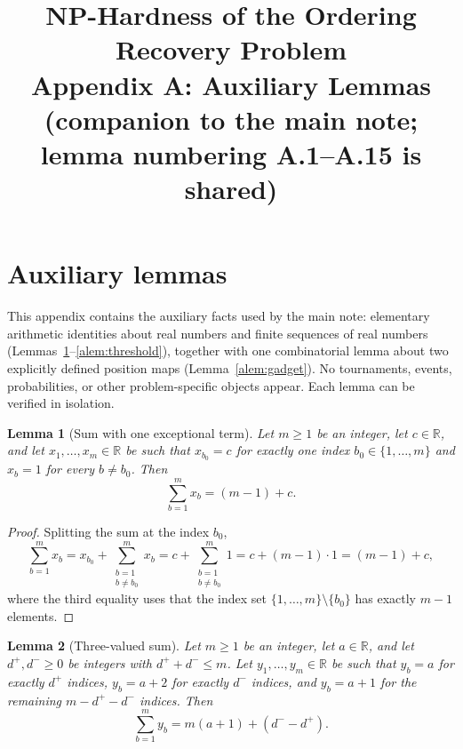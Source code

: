 \documentclass[11pt]{article}
\title{NP-Hardness of the Ordering Recovery Problem\\
\large Appendix A: Auxiliary Lemmas\\[2pt]
\normalsize (companion to the main note; lemma numbering A.1--A.15 is shared)}
\author{}
\date{}
\newtheorem{alemma}{Lemma}[section] %
\begin{document}
\maketitle

\appendix
\setcounter{section}{0}

\section{Auxiliary lemmas}\label{app:algebra}

This appendix contains the auxiliary facts used by the main note: elementary arithmetic identities about real numbers and finite sequences of real numbers (Lemmas~\ref{alem:onesum}--\ref{alem:threshold}), together with one combinatorial lemma about two explicitly defined position maps (Lemma~\ref{alem:gadget}).  No tournaments, events, probabilities, or other problem-specific objects appear.  Each lemma can be verified in isolation.

\begin{alemma}[Sum with one exceptional term]\label{alem:onesum}
Let $m\ge 1$ be an integer, let $c\in\mathbb{R}$, and let $x_1,\ldots,x_m\in\mathbb{R}$ be such that $x_{b_0}=c$ for exactly one index $b_0\in\{1,\ldots,m\}$ and $x_b=1$ for every $b\ne b_0$.  Then
\begin{equation}
  \sum_{b=1}^m x_b=(m-1)+c.
\end{equation}
\end{alemma}

\begin{proof}
Splitting the sum at the index $b_0$,
\begin{equation}
  \sum_{b=1}^m x_b
  = x_{b_0}+\sum_{\substack{b=1\\ b\ne b_0}}^m x_b
  = c+\sum_{\substack{b=1\\ b\ne b_0}}^m 1
  = c+(m-1)\cdot 1
  = (m-1)+c,
\end{equation}
where the third equality uses that the index set $\{1,\ldots,m\}\setminus\{b_0\}$ has exactly $m-1$ elements.
\end{proof}

\begin{alemma}[Three-valued sum]\label{alem:threesum}
Let $m\ge 1$ be an integer, let $a\in\mathbb{R}$, and let $d^+,d^-\ge 0$ be integers with $d^++d^-\le m$.  Let $y_1,\ldots,y_m\in\mathbb{R}$ be such that $y_b=a$ for exactly $d^+$ indices, $y_b=a+2$ for exactly $d^-$ indices, and $y_b=a+1$ for the remaining $m-d^+-d^-$ indices.  Then
\begin{equation}
  \sum_{b=1}^m y_b=m(a+1)+(d^--d^+).
\end{equation}
\end{alemma}
\end{document}
